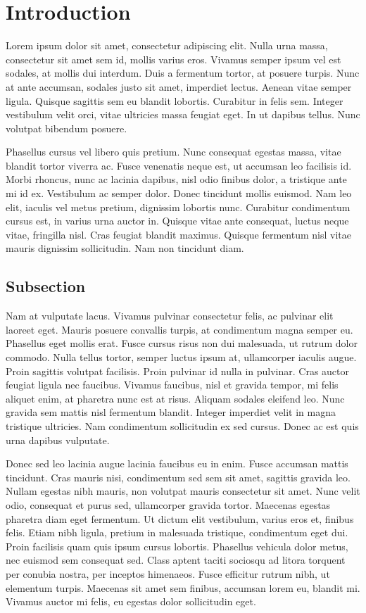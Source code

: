 \section{Introduction}
Lorem ipsum dolor sit amet, consectetur adipiscing elit. Nulla urna massa, consectetur sit amet sem id, mollis varius eros. Vivamus semper ipsum vel est sodales, at mollis dui interdum. Duis a fermentum tortor, at posuere turpis. Nunc at ante accumsan, sodales justo sit amet, imperdiet lectus. Aenean vitae semper ligula. Quisque sagittis sem eu blandit lobortis. Curabitur in felis sem. Integer vestibulum velit orci, vitae ultricies massa feugiat eget. In ut dapibus tellus. Nunc volutpat bibendum posuere.

Phasellus cursus vel libero quis pretium. Nunc consequat egestas massa, vitae blandit tortor viverra ac. Fusce venenatis neque est, ut accumsan leo facilisis id. Morbi rhoncus, nunc ac lacinia dapibus, nisl odio finibus dolor, a tristique ante mi id ex. Vestibulum ac semper dolor. Donec tincidunt mollis euismod. Nam leo elit, iaculis vel metus pretium, dignissim lobortis nunc. Curabitur condimentum cursus est, in varius urna auctor in. Quisque vitae ante consequat, luctus neque vitae, fringilla nisl. Cras feugiat blandit maximus. Quisque fermentum nisl vitae mauris dignissim sollicitudin. Nam non tincidunt diam.

\subsection{Subsection}
Nam at vulputate lacus. Vivamus pulvinar consectetur felis, ac pulvinar elit laoreet eget. Mauris posuere convallis turpis, at condimentum magna semper eu. Phasellus eget mollis erat. Fusce cursus risus non dui malesuada, ut rutrum dolor commodo. Nulla tellus tortor, semper luctus ipsum at, ullamcorper iaculis augue. Proin sagittis volutpat facilisis. Proin pulvinar id nulla in pulvinar. Cras auctor feugiat ligula nec faucibus. Vivamus faucibus, nisl et gravida tempor, mi felis aliquet enim, at pharetra nunc est at risus. Aliquam sodales eleifend leo. Nunc gravida sem mattis nisl fermentum blandit. Integer imperdiet velit in magna tristique ultricies. Nam condimentum sollicitudin ex sed cursus. Donec ac est quis urna dapibus vulputate.

Donec sed leo lacinia augue lacinia faucibus eu in enim. Fusce accumsan mattis tincidunt. Cras mauris nisi, condimentum sed sem sit amet, sagittis gravida leo. Nullam egestas nibh mauris, non volutpat mauris consectetur sit amet. Nunc velit odio, consequat et purus sed, ullamcorper gravida tortor. Maecenas egestas pharetra diam eget fermentum. Ut dictum elit vestibulum, varius eros et, finibus felis. Etiam nibh ligula, pretium in malesuada tristique, condimentum eget dui. Proin facilisis quam quis ipsum cursus lobortis. Phasellus vehicula dolor metus, nec euismod sem consequat sed. Class aptent taciti sociosqu ad litora torquent per conubia nostra, per inceptos himenaeos. Fusce efficitur rutrum nibh, ut elementum turpis. Maecenas sit amet sem finibus, accumsan lorem eu, blandit mi. Vivamus auctor mi felis, eu egestas dolor sollicitudin eget.

